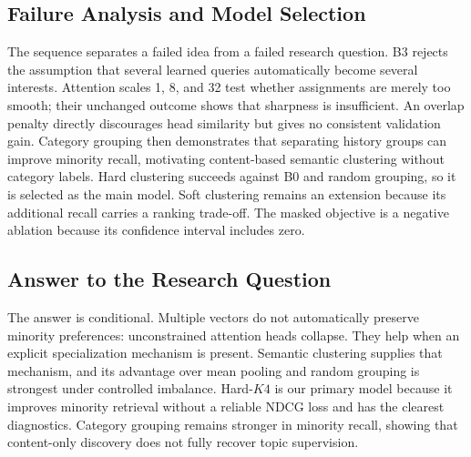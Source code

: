 \subsection{Failure Analysis and Model Selection}
The sequence separates a failed idea from a failed research question. B3 rejects the assumption that several learned queries automatically become several interests. Attention scales 1, 8, and 32 test whether assignments are merely too smooth; their unchanged outcome shows that sharpness is insufficient. An overlap penalty directly discourages head similarity but gives no consistent validation gain. Category grouping then demonstrates that separating history groups can improve minority recall, motivating content-based semantic clustering without category labels. Hard clustering succeeds against B0 and random grouping, so it is selected as the main model. Soft clustering remains an extension because its additional recall carries a ranking trade-off. The masked objective is a negative ablation because its confidence interval includes zero.

\subsection{Answer to the Research Question}
The answer is conditional. Multiple vectors do not automatically preserve minority preferences: unconstrained attention heads collapse. They help when an explicit specialization mechanism is present. Semantic clustering supplies that mechanism, and its advantage over mean pooling and random grouping is strongest under controlled imbalance. Hard-$K4$ is our primary model because it improves minority retrieval without a reliable NDCG loss and has the clearest diagnostics. Category grouping remains stronger in minority recall, showing that content-only discovery does not fully recover topic supervision.

